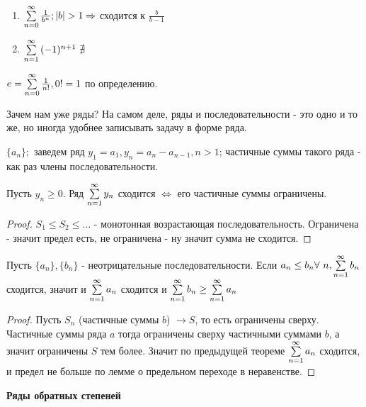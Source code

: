 \documentclass[12pt]{report}
\begin{document}
\begin{ex}
\begin{enumerate}
\item $\sum\limits_{n = 0}^\infty{\frac{1}{b^n}}; |b| > 1 \Rightarrow$ сходится к $\frac{b}{b - 1}$
\item $\sum\limits_{n = 1}^\infty{(-1)^{n + 1}} ~\nexists$
\end{enumerate}
\end{ex}

\begin{rem}
$e = \sum\limits_{n = 0}^\infty{\frac{1}{n!}}, 0! = 1$ по определению.
\end{rem}

\begin{note}
Зачем нам уже ряды? На самом деле, ряды и последовательности - это одно и то же, но иногда удобнее записывать задачу в форме ряда.

$\{a_n\};$ заведем ряд $y_1 = a_1, y_n = a_n - a_{n - 1}, n > 1$; частичные суммы такого ряда - как раз члены последовательности.
\end{note}

\begin{thm}
Пусть $y_n \ge 0$. Ряд $\sum\limits_{n = 1}^\infty{y_n}$ сходится $\Leftrightarrow$ его частичные суммы ограничены.
\end{thm}
\begin{proof}
$S_1 \le S_2 \le \dots$ - монотонная возрастающая последовательность. Ограничена - значит предел есть, не ограничена - ну значит сумма не сходится.
\end{proof}

\begin{thm}
Пусть $\{a_n\}, \{b_n\}$ - неотрицательные последовательности. Если $a_n \le b_n \forall ~n, \sum\limits_{n = 1}^\infty{b_n}$ сходится, значит и $\sum\limits_{n = 1}^\infty{a_n}$ сходится и $\sum\limits_{n = 1}^\infty{b_n} \ge \sum\limits_{n = 1}^\infty{a_n}$
\end{thm}
\begin{proof}
Пусть $S_n$ (частичные суммы $b$) $\to S$, то есть ограничены сверху. Частичные суммы ряда $a$ тогда ограничены сверху частичными суммами $b$, а значит ограничены $S$ тем более. Значит по предыдущей теореме $\sum\limits_{n = 1}^\infty{a_n}$ сходится, и предел не больше по лемме о предельном переходе в неравенстве.
\end{proof}

\begin{center}
{\bfseries Ряды обратных степеней}
\end{center}
\end{document}
